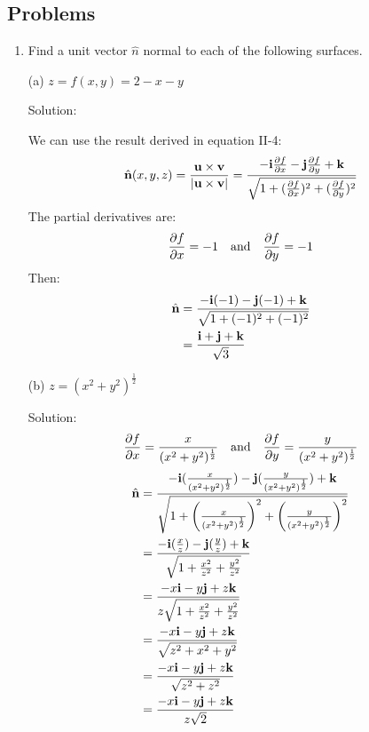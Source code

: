 \documentclass{article}
\begin{document}
\subsection*{Problems}
\begin{enumerate}
    \item Find a unit vector $\hat{n}$ normal to each of the following surfaces.

    (a) $z = f(x,y) = 2 - x - y$

    Solution:

    We can use the result derived in equation II-4:
    \[ \hat{\textbf{n}}(x,y,z) = \frac{\textbf{u} \times \textbf{v}}{|\textbf{u} \times \textbf{v}|} = \frac{-\textbf{i}\frac{\partial{f}}{\partial{x}} -\textbf{j}\frac{\partial{f}}{\partial{y}} + \textbf{k}} {\sqrt{1 + (\frac{\partial{f}}{\partial{x}})^2 + (\frac{\partial{f}}{\partial{y}})^2 }} \]
    The partial derivatives are:
    \[ \frac{\partial{f}}{\partial{x}} = -1 \quad \textnormal{and} \quad \frac{\partial{f}}{\partial{y}} = -1 \]
    Then:
    \begin{align*}
        \hat{\textbf{n}} &= \frac{-\textbf{i}(-1) -\textbf{j}(-1) + \textbf{k}} {\sqrt{1 + (-1)^2 + (-1)^2 }} \\
        &= \frac{\textbf{i} + \textbf{j} + \textbf{k}}{\sqrt{3}}
    \end{align*}

    (b) $z = (x^2 + y^2)^\frac{1}{2}$

    Solution:
    \[ \frac{\partial{f}}{\partial{x}} = \frac{x}{(x^2 + y^2)^\frac{1}{2}} \quad \textnormal{and} \quad \frac{\partial{f}}{\partial{y}} = \frac{y}{(x^2 + y^2)^\frac{1}{2}} \]
    \begin{align*}
        \hat{\textbf{n}} &= \frac{-\textbf{i}(\frac{x}{{(x^2 + y^2)}^\frac{1}{2}}) -\textbf{j}(\frac{y}{(x^2 + y^2)^\frac{1}{2}}) + \textbf{k}} {\sqrt{1 + \left( \frac{x}{(x^2 + y^2)^\frac{1}{2}} \right)^2 + \left( \frac{y}{(x^2 + y^2)^\frac{1}{2}} \right)^2 }} \\
        &= \frac{-\textbf{i}(\frac{x}{z}) -\textbf{j}(\frac{y}{z}) + \textbf{k}} {\sqrt{1 + \frac{x^2}{z^2} + \frac{y^2}{z^2} }} \\
        &= \frac{-x\textbf{i} -y\textbf{j} + z\textbf{k}} {z\sqrt{1 + \frac{x^2}{z^2} + \frac{y^2}{z^2} }} \\
        &= \frac{-x\textbf{i} -y\textbf{j} + z\textbf{k}} {\sqrt{z^2 + x^2 + y^2}} \\
        &= \frac{-x\textbf{i} -y\textbf{j} + z\textbf{k}} {\sqrt{z^2 + z^2}} \\
        &= \frac{-x\textbf{i} -y\textbf{j} + z\textbf{k}} {z\sqrt{2}} \\
    \end{align*}


\end{enumerate}
\end{document}
